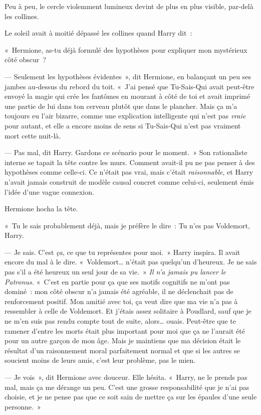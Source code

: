 Peu à peu, le cercle violemment lumineux devint de plus en plus visible, par-delà les collines.

Le soleil avait à moitié dépassé les collines quand Harry dit~:

«~Hermione, as-tu déjà formulé des hypothèses pour expliquer mon mystérieux côté obscur~?

--- Seulement les hypothèses évidentes~», dit Hermione, en balançant un peu ses jambes au-dessus du rebord du toit. «~J'ai pensé que Tu-Sais-Qui avait peut-être envoyé la magie qui crée les fantômes en mourant à côté de toi et avait imprimé une partie de lui dans ton cerveau plutôt que dans le plancher. Mais ça m'a toujours eu l'air bizarre, comme une explication intelligente qui n'est pas \emph{vraie} pour autant, et elle a encore moins de sens si Tu-Sais-Qui n'est pas vraiment mort cette nuit-là.

--- Pas mal, dit Harry. Gardons ce scénario pour le moment.~» Son rationaliste interne se tapait la tête contre les murs. Comment avait-il pu ne pas penser à des hypothèses comme celle-ci. Ce n'était pas vrai, mais c'était \emph{raisonnable}, et Harry n'avait jamais construit de modèle causal concret comme celui-ci, seulement émis l'idée d'une vague connexion.

Hermione hocha la tête.

«~Tu le sais probablement déjà, mais je préfère le dire~: Tu n'es pas Voldemort, Harry.

--- Je sais. C'est \emph{ça}, ce que tu représentes pour moi.~» Harry inspira. Il avait encore du mal à le dire. «~Voldemort… n'était pas quelqu'un d'heureux. Je ne sais pas s'il a été heureux un seul jour de sa vie.~» \emph{Il n'a jamais pu lancer le Patronus.} «~C'est en partie pour ça que ses motifs cognitifs ne m'ont pas dominé~: mon côté obscur n'a jamais été agréable, il ne déclenchait pas de renforcement positif. Mon amitié avec toi, ça veut dire que ma vie n'a pas à ressembler à celle de Voldemort. Et j'étais assez solitaire à Poudlard, sauf que je ne m'en suis pas rendu compte tout de suite, alors… ouais. Peut-être que te ramener d'entre les morts était plus important pour moi que ça ne l'aurait été pour un autre garçon de mon âge. Mais je maintiens que ma décision était le résultat d'un raisonnement moral parfaitement normal et que si les autres se soucient moins de leurs amis, c'est leur problème, pas le mien.

--- Je vois~», dit Hermione avec douceur. Elle hésita. «~Harry, ne le prends pas mal, mais ça me dérange un peu. C'est une grosse responsabilité que je n'ai pas choisie, et je ne pense pas que ce soit sain de mettre ça sur les épaules d'une seule personne.~»

